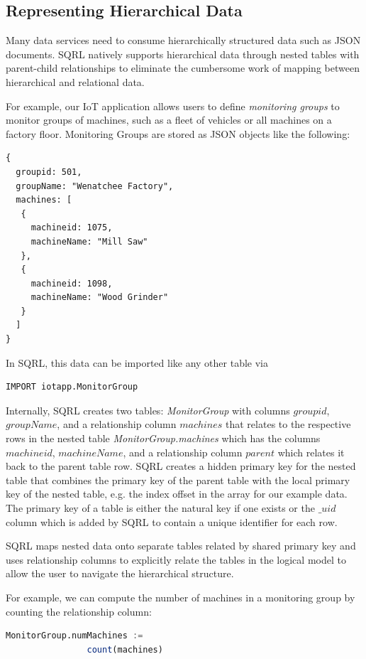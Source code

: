 \documentclass[	DIV=calc,%
							paper=letter,%
							fontsize=11pt,%
							twocolumn]{scrartcl}	 					%
\begin{document}
\subsection{Representing Hierarchical Data}

Many data services need to consume hierarchically structured data such as JSON documents. SQRL natively supports hierarchical data through nested tables with parent-child relationships to eliminate the cumbersome work of mapping between hierarchical and relational data.

For example, our IoT application allows users to define \emph{monitoring groups} to monitor groups of machines, such as a fleet of vehicles or all machines on a factory floor. Monitoring Groups are stored as JSON objects like the following:

\begin{lstlisting}
{
  groupid: 501,
  groupName: "Wenatchee Factory",
  machines: [
   {
     machineid: 1075,
     machineName: "Mill Saw"
   },
   {
     machineid: 1098,
     machineName: "Wood Grinder"
   }
  ]
}
\end{lstlisting}

In SQRL, this data can be imported like any other table via
\begin{lstlisting}
IMPORT iotapp.MonitorGroup
\end{lstlisting}

Internally, SQRL creates two tables: \emph{MonitorGroup} with columns $groupid$, $groupName$, and a relationship column $machines$ that relates to the respective rows in the nested table \emph{MonitorGroup.machines} which has the columns $machineid$, $machineName$, and a relationship column $parent$ which relates it back to the parent table row. SQRL creates a hidden primary key for the nested table that combines the primary key of the parent table with the local primary key of the nested table, e.g. the index offset in the array for our example data. The primary key of a table is either the natural key if one exists or the $\_uid$ column which is added by SQRL to contain a unique identifier for each row.

SQRL maps nested data onto separate tables related by shared primary key and uses relationship columns to explicitly relate the tables in the logical model to allow the user to navigate the hierarchical structure.

For example, we can compute the number of machines in a monitoring group by counting the relationship column:
\begin{lstlisting}[language=SQL]
MonitorGroup.numMachines :=
                count(machines)
\end{lstlisting}
\end{document}
